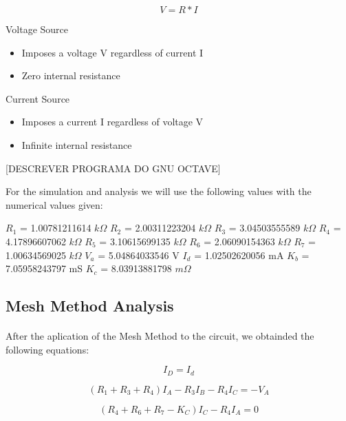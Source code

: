 \begin{equation}
	V = R * I
	\label{eq:kvl}
\end{equation}

Voltage Source

\begin{itemize}
	\item Imposes a voltage V regardless of current I
	\item Zero internal resistance
\end{itemize}

Current Source

\begin{itemize}
	\item Imposes a current I regardless of voltage V
	\item Infinite internal resistance
\end{itemize}

[DESCREVER PROGRAMA DO GNU OCTAVE]

For the simulation and analysis we will use the following values with the numerical values given:

$R_1$ = 1.00781211614 $k\Omega$
$R_2$ = 2.00311223204 $k\Omega$
$R_3$ = 3.04503555589 $k\Omega$
$R_4$ = 4.17896607062 $k\Omega$
$R_5$ = 3.10615699135 $k\Omega$
$R_6$ = 2.06090154363 $k\Omega$
$R_7$ = 1.00634569025 $k\Omega$
$V_a$ = 5.04864033546 V
$I_d$ = 1.02502620056 mA
$K_b$ = 7.05958243797 mS
$K_c$ = 8.03913881798 $m\Omega$

\subsection{Mesh Method Analysis}

\paragraph{} After the aplication of the Mesh Method to the circuit, we obtainded the following equations:

\begin{equation}
	I_D = I_d
	\label{eq:1}
\end{equation}

\begin{equation}
	(R_1 + R_3 + R_4) I_A -R_3 I_B - R_4 I_C = - V_A
	\label{eq:1}
\end{equation}

\begin{equation}
	(R_4 + R_6 + R_7 - K_C) I_C - R_4 I_A = 0
	\label{eq:2}
\end{equation}

